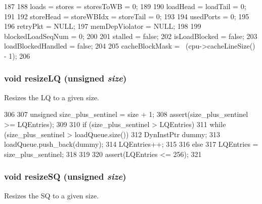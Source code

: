 \begin{DoxyCode}
187 {
188     loads = stores = storesToWB = 0;
189 
190     loadHead = loadTail = 0;
191 
192     storeHead = storeWBIdx = storeTail = 0;
193 
194     usedPorts = 0;
195 
196     retryPkt = NULL;
197     memDepViolator = NULL;
198 
199     blockedLoadSeqNum = 0;
200 
201     stalled = false;
202     isLoadBlocked = false;
203     loadBlockedHandled = false;
204 
205     cacheBlockMask = ~(cpu->cacheLineSize() - 1);
206 }
\end{DoxyCode}
\hypertarget{classLSQUnit_a3bc9500810cb2d5615e29206e2d6499f}{
\subsubsection[{resizeLQ}]{\setlength{\rightskip}{0pt plus 5cm}void resizeLQ (unsigned {\em size})}}
\label{classLSQUnit_a3bc9500810cb2d5615e29206e2d6499f}
Resizes the LQ to a given size. 


\begin{DoxyCode}
306 {
307     unsigned size_plus_sentinel = size + 1;
308     assert(size_plus_sentinel >= LQEntries);
309 
310     if (size_plus_sentinel > LQEntries) {
311         while (size_plus_sentinel > loadQueue.size()) {
312             DynInstPtr dummy;
313             loadQueue.push_back(dummy);
314             LQEntries++;
315         }
316     } else {
317         LQEntries = size_plus_sentinel;
318     }
319 
320     assert(LQEntries <= 256);
321 }
\end{DoxyCode}
\hypertarget{classLSQUnit_a341dd6a3bd8d240659fd9d698c3b5c65}{
\subsubsection[{resizeSQ}]{\setlength{\rightskip}{0pt plus 5cm}void resizeSQ (unsigned {\em size})}}
\label{classLSQUnit_a341dd6a3bd8d240659fd9d698c3b5c65}
Resizes the SQ to a given size. 


